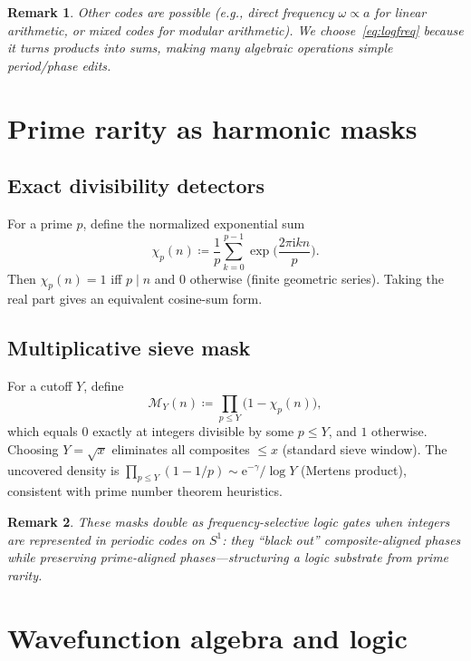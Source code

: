 \documentclass[12pt]{article}
\newtheorem{remark}{Remark}
\newcommand{\e}{\mathrm{e}}
\newcommand{\ii}{\mathrm{i}}
\begin{document}
\begin{remark}
Other codes are possible (e.g., direct frequency $\omega\propto a$ for linear arithmetic, or mixed codes for modular arithmetic). We choose~\eqref{eq:logfreq} because it turns products into sums, making many algebraic operations simple period/phase edits.
\end{remark}

\section{Prime rarity as harmonic masks}
\subsection{Exact divisibility detectors}
For a prime $p$, define the normalized exponential sum
\begin{equation}
\label{eq:chip}
\chi_p(n)\coloneqq \frac{1}{p}\sum_{k=0}^{p-1} \exp\!\Big(\frac{2\pi \ii k n}{p}\Big).
\end{equation}
Then $\chi_p(n)=1$ iff $p\mid n$ and $0$ otherwise (finite geometric series). Taking the real part gives an equivalent cosine-sum form.

\subsection{Multiplicative sieve mask}
For a cutoff $Y$, define
\begin{equation}
\label{eq:mask}
\mathcal{M}_Y(n)\coloneqq \prod_{p\le Y}\bigl(1-\chi_p(n)\bigr),
\end{equation}
which equals $0$ exactly at integers divisible by some $p\le Y$, and $1$ otherwise. Choosing $Y=\sqrt{x}$ eliminates all composites $\le x$ (standard sieve window). The uncovered density is $\prod_{p\le Y}(1-1/p)\sim \e^{-\gamma}/\log Y$ (Mertens product), consistent with prime number theorem heuristics.

\begin{remark}
These masks double as \emph{frequency-selective logic gates} when integers are represented in periodic codes on $S^1$: they “black out” composite-aligned phases while preserving prime-aligned phases—structuring a logic substrate from prime rarity.
\end{remark}

\section{Wavefunction algebra and logic}
\end{document}
